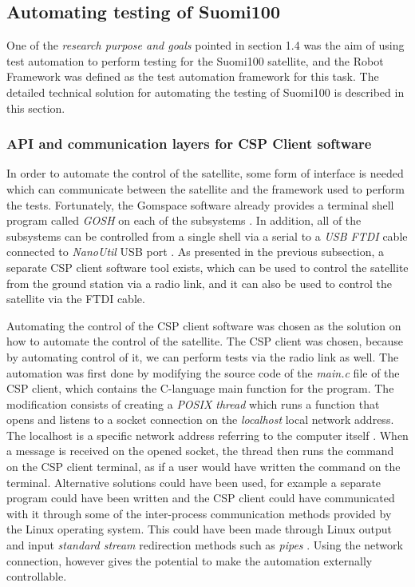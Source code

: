 \documentclass[english,12pt,a4paper,pdftex,elec,utf8]{aaltothesis}
\begin{document}
\subsection{Automating testing of Suomi100}
One of the \textit{research purpose and goals} pointed in section 1.4 was the aim of using test automation to perform testing for the Suomi100 satellite, and the Robot Framework was defined as the test automation framework for this task. The detailed technical solution for automating the testing of Suomi100 is described in this section.
\subsubsection{API and communication layers for CSP Client software}
In order to automate the control of the satellite, some form of interface is needed which can
communicate between the satellite and the framework used to perform the tests.
Fortunately, the Gomspace software already provides a terminal shell program called \textit{GOSH} on each of the subsystems \cite{nanomindds}. In addition, all of the subsystems can be controlled from a single shell via a serial to a \textit{USB FTDI} cable connected to \textit{NanoUtil} USB port \cite{avrtoolchain}. As presented in the previous subsection,  a separate CSP client
software tool exists, which can be used to control the satellite from the 
ground station via a radio link, and it can also be used to control the satellite via the FTDI cable.\par
Automating the control of the CSP client software was chosen as the solution on how to 
automate the control of the satellite. The CSP client was chosen, because by automating
control of it, we can perform tests via the radio link as well. The automation was first done by
modifying the source code of the \textit{main.c} file of the CSP client, which contains the C-language main function for the program. The modification consists of creating a \textit{POSIX thread} which runs a function that opens and listens to a socket connection on the \textit{localhost} local network address. The localhost is a specific network address referring to the computer itself \cite{linuxproginterface}. When a message is received on the opened socket, the thread then runs the command on the CSP client terminal, as if a user would have written the command on the terminal. Alternative solutions could have been used, for example a separate program could have been written and the CSP client could have communicated with it through some of the inter-process communication methods provided by the Linux operating system. This could have been made through Linux output and input \textit{standard stream} redirection methods such as \textit{pipes} \cite{linuxproginterface}. Using the network connection, however gives the potential to make the automation externally controllable. \par 
\end{document}

